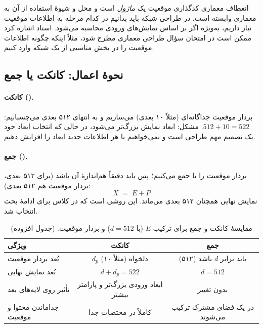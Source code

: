 \begin{exambox}{انعطاف معماری}
کدگذاری موقعیت یک \emph{ماژول} است و محل و شیوهٔ استفاده از آن به معماری وابسته است. در طراحی شبکه باید بدانیم در کدام مرحله به اطلاعات موقعیت نیاز داریم، به‌ویژه اگر  بر اساس نمایش‌های ورودی محاسبه می‌شود. استاد اشاره کرد ممکن است در امتحان سؤال طراحی معماری مطرح شود، مثلاً اینکه چگونه اطلاعات موقعیت را در بخش مناسبی از یک شبکه وارد کنیم.
\end{exambox}

\subsection{نحوهٔ اعمال: کانکت یا جمع}
\paragraph{کانکت ().} بردار موقعیت جداگانه‌ای (مثلاً ۱۰ بعدی) می‌سازیم و به انتهای  ۵۱۲ بعدی می‌چسبانیم: $512+10=522$. مشکل: ابعاد نمایش بزرگ‌تر می‌شود، در حالی که انتخاب ابعاد  خود یک تصمیم مهم طراحی است و نمی‌خواهیم با هر اطلاعات جدید ابعاد را افزایش دهیم.

\paragraph{جمع ().} بردار موقعیت را با  جمع می‌کنیم؛ پس باید دقیقاً هم‌اندازهٔ آن باشد (برای  ۵۱۲ بعدی، بردار موقعیت هم ۵۱۲ بعدی):
\[
\boxed{X \;=\; E + P}
\]
نمایش نهایی همچنان ۵۱۲ بعدی می‌ماند. این روشی است که در کلاس برای ادامهٔ بحث انتخاب شد.

\begin{table}[htbp]
\centering
\caption{مقایسهٔ کانکت و جمع برای ترکیب $E$ (با $d=512$) و بردار موقعیت. (جدول افزوده)}
\begin{tabular}{lcc}
\toprule
ویژگی & کانکت & جمع \\
\midrule
بُعد بردار موقعیت & $d_p$ دلخواه (مثلاً ۱۰) & باید برابر $d$ باشد (۵۱۲) \\
بُعد نمایش نهایی & $d+d_p=522$ & $d=512$ \\
تأثیر روی لایه‌های بعد & ابعاد ورودی بزرگ‌تر و پارامتر بیشتر & بدون تغییر \\
جداماندن محتوا و موقعیت & کاملاً در مختصات جدا & در یک فضای مشترک ترکیب می‌شوند \\
\bottomrule
\end{tabular}
\end{table}

